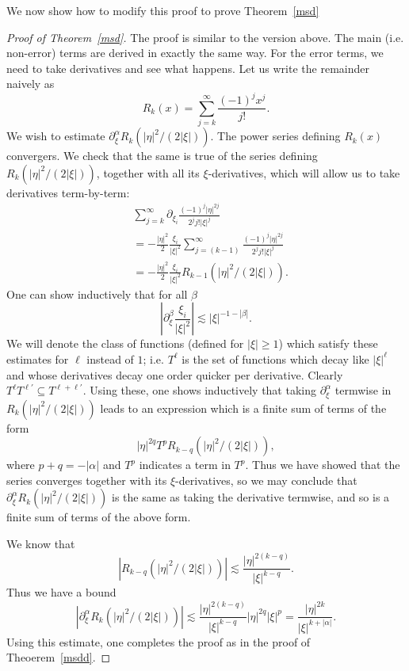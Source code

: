 \documentclass[12pt]{article}
\begin{document}
We now show how to modify this proof to prove Theorem~\ref{msd}
\begin{proof}[Proof of Theorem~\ref{msd}]
The proof is similar to the version above. The main (i.e. non-error) terms are derived in exactly the same way. For the error terms, we need to take derivatives and see what happens. Let us write the remainder naively as
\[R_k(x) = \sum_{j=k}^\infty \frac{(-1)^jx^j}{j!}.\] We wish to estimate $\partial^{\alpha}_\xi R_k(|\eta|^{2}/(2|\xi|))$.
The power series defining $R_k(x)$ convergers. We check that the same is true of the series defining $R_k(|\eta|^{2}/(2|\xi|))$, together with all its $\xi$-derivatives, which will allow us to take derivatives term-by-term:
\begin{align*}
&\sum_{j=k}^\infty \partial_{\xi_i}  \frac{(-1)^j|\eta|^{2j}}{2^j j!|\xi|^{j}}\\
&= -\frac{|\eta|^{2}}{2}\frac{\xi_i}{|\xi|^2} \sum_{j=(k-1)}^\infty \frac{(-1)^j|\eta|^{2j}}{2^j j!|\xi|^{j}}\\
&= -\frac{|\eta|^{2}}{2}\frac{\xi_i}{|\xi|^2}R_{k-1}(|\eta|^{2}/(2|\xi|)).\end{align*}
One can show inductively that for all $\beta$
\[\left|\partial_{\xi}^{\beta}\frac{\xi_i}{|\xi|^2}\right| \lesssim |\xi|^{-1-|\beta|}.\] We will denote the class of functions (defined for $|\xi| \geq 1$) which satisfy these estimates for $\ell$ instead of $1$; i.e. $T^{\ell}$ is the set of functions which decay like $|\xi|^{\ell}$ and whose derivatives decay one order quicker per derivative. Clearly $T^{\ell}T^{\ell'} \subseteq T^{\ell+\ell'}$. Using these, one shows inductively that taking $\partial_{\xi}^{\alpha}$ termwise in $R_k(|\eta|^{2}/(2|\xi|))$ leads to an expression which is a finite sum of terms of the form
\[|\eta|^{2q}T^{p}R_{k-q}(|\eta|^{2}/(2|\xi|)),\]
where $p+q=-|\alpha|$ and $T^{p}$ indicates a term in $T^{p}$.
Thus we have showed that the series converges together with its $\xi$-derivatives, so we may conclude that $\partial_{\xi}^{\alpha} R_k(|\eta|^{2}/(2|\xi|))$ is the same as taking the derivative termwise, and so is a finite sum of terms of the above form.

 We know that
\[|R_{k-q}(|\eta|^{2}/(2|\xi|))| \lesssim \frac{|\eta|^{2(k-q)}}{|\xi|^{k-q}}.\]
Thus we have a bound
\[|\partial^{\alpha}_\xi R_k(|\eta|^{2}/(2|\xi|))| \lesssim \frac{|\eta|^{2(k-q)}}{|\xi|^{k-q}}|\eta|^{2q}|\xi|^{p} = \frac{|\eta|^{2k}}{|\xi|^{k+|\alpha|}}.\]
Using this estimate, one completes the proof as in the proof of Theoerem~\ref{msdd}.
\end{proof}
\end{document}
